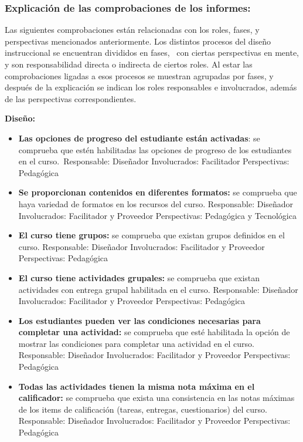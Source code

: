 \subsubsection{Explicación de las comprobaciones de los informes:}

Las siguientes comprobaciones están relacionadas con los roles, fases, y
perspectivas mencionados anteriormente. Los distintos procesos del
diseño instruccional se encuentran divididos en fases, ~con ciertas
perspectivas en mente, y son responsabilidad directa o indirecta de
ciertos roles. Al estar las comprobaciones ligadas a esos procesos se
muestran agrupadas por fases, y después de la explicación se indican los
roles responsables e involucrados, además de las perspectivas
correspondientes.

\textbf{Diseño:}

\begin{itemize}
	\item
	\textbf{Las opciones de progreso del estudiante están activadas}: se
	comprueba que estén habilitadas las opciones de progreso de los
	estudiantes en el curso.~{Responsable:} Diseñador
	{Involucrados:} Facilitador {Perspectivas:} Pedagógica
	\item
	\textbf{Se proporcionan contenidos en diferentes formatos:} se
	comprueba que haya variedad de formatos en los recursos del curso.
	{Responsable:} Diseñador {Involucrados:} Facilitador y
	Proveedor {Perspectivas:} Pedagógica y Tecnológica
	\item
	\textbf{El curso tiene grupos:} se comprueba que existan grupos
	definidos en el curso. {Responsable:} Diseñador
	{Involucrados:} Facilitador y Proveedor {Perspectivas:}
	Pedagógica
	\item
	\textbf{El curso tiene actividades grupales:} se comprueba que existan
	actividades con entrega grupal habilitada en el curso.
	{Responsable:} Diseñador {Involucrados:} Facilitador y
	Proveedor {Perspectivas:} Pedagógica
	\item
	\textbf{Los estudiantes pueden ver las condiciones necesarias para
		completar una actividad:} se comprueba que esté habilitada la opción
	de mostrar las condiciones para completar una actividad en el curso.
	{Responsable:} Diseñador {Involucrados:} Facilitador y
	Proveedor {Perspectivas:} Pedagógica
	\item
	\textbf{Todas las actividades tienen la misma nota máxima en el
		calificador:} se comprueba que exista una consistencia en las notas
	máximas de los items de calificación (tareas, entregas, cuestionarios)
	del curso. {Responsable:} Diseñador {Involucrados:}
	Facilitador y Proveedor {Perspectivas:} Pedagógica
\end{itemize}

